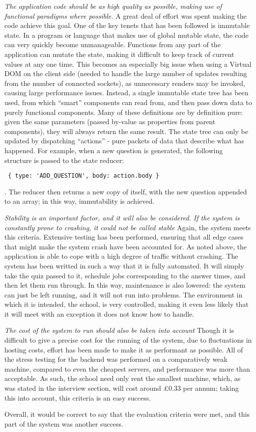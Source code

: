 \textit{The application code should be as high quality as possible, making use of functional paradigms where possible.} A great deal of effort was spent making the code achieve this goal. One of the key tenets that has been followed is immutable state. In a program or language that makes use of global mutable state, the code can very quickly become unmanageable. Functions from any part of the application can mutate the state, making it difficult to keep track of current values at any one time. This becomes an especially big issue when using a Virtual DOM on the client side (needed to handle the large number of updates resulting from the number of connected sockets), as unnecessary renders may be invoked, causing large performance issues. Instead, a single immutable state tree has been used, from which ``smart'' components can read from, and then pass down data to purely functional components. Many of these definitions are by definition pure: given the same parameters (passed by-value as properties from parent components), they will always return the same result. The state tree can only be updated by dispatching ``actions'' - pure packets of data that describe what has happened. For example, when a new question is generated, the following structure is passed to the state reducer: \begin{verbatim} { type: 'ADD_QUESTION', body: action.body } \end{verbatim}. The reducer then returns a new copy of itself, with the new question appended to an array; in this way, immutability is achieved.

\textit{Stability is an important factor, and it will also be considered. If the system is constantly prone to crashing, it could not be called stable} Again, the system meets this criteria. Extensive testing has been performed, ensuring that all edge cases that might make the system crash have been accounted for. As noted above, the application is able to cope with a high degree of traffic without crashing. The system has been writted in such a way that it is fully automated. It will simply take the quiz passed to it, schedule jobs corresponding to the answer times, and then let them run through. In this way, maintenance is also lowered: the system can just be left running, and it will not run into problems. The environment in which it is intended, the school, is very controlled, making it even less likely that it will meet with an exception it does not know how to handle.

\textit{The cost of the system to run should also be taken into account} Though it is difficult to give a precise cost for the running of the system, due to fluctuations in hosting costs, effort has been made to make it as performant as possible. All of the stress testing for the backend was performed on a comparatively weak machine, compared to even the cheapest servers, and performance was more than acceptable. As such, the school need only rent the smallest machine, which, as was stated in the interview section, will cost around £0.33 per annum; taking this into account, this criteria is an easy success.

Overall, it would be correct to say that the evaluation criteria were met, and this part of the system was another success.
